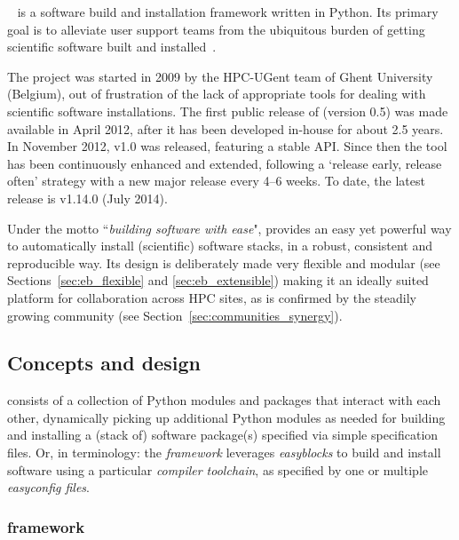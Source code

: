 \easybuild{}~\cite{EasyBuildSC12} is a software build and installation framework
written in Python. Its primary goal is to alleviate user support teams from the
ubiquitous burden of getting scientific software built and installed~\cite{Dubois03}.

The \easybuild{} project was started in 2009 by the HPC-UGent team of Ghent
University (Belgium), out of frustration of the lack of appropriate tools for dealing
with scientific software installations. The first public release of \easybuild{} (version 0.5) was made available in April 2012, after it has been developed in-house for 
about 2.5 years. In November 2012, \easybuild{} v1.0 was released, featuring
a stable API. Since then the tool has been continuously enhanced and extended,
following a `release early, release often' strategy with a new major release every
4--6 weeks. To date, the latest release is \easybuild{} v1.14.0 (July 2014).

Under the motto ``\emph{building software with ease}", \easybuild{} provides an easy
yet powerful way to automatically install (scientific) software stacks, in a robust,
consistent and reproducible way. Its design is deliberately made very flexible and
modular (see Sections~\ref{sec:eb_flexible} and \ref{sec:eb_extensible}) making it
an ideally suited platform for collaboration across HPC sites, as is confirmed by
the steadily growing \easybuild{} community (see
Section~\ref{sec:communities_synergy}).

\subsection{Concepts and design}

\easybuild{} consists of a collection of Python modules and packages that
interact with each other, dynamically picking up additional Python modules as needed
for building and installing a (stack of) software package(s) specified via simple
specification files. Or, in \easybuild{} terminology: the \easybuild{}
\emph{framework} leverages \emph{easyblocks} to build and install software using
a particular \emph{compiler toolchain}, as specified by one or multiple
\emph{easyconfig files}.

\subsubsection{\easybuild{} framework}
\label{sec:eb_framework}

